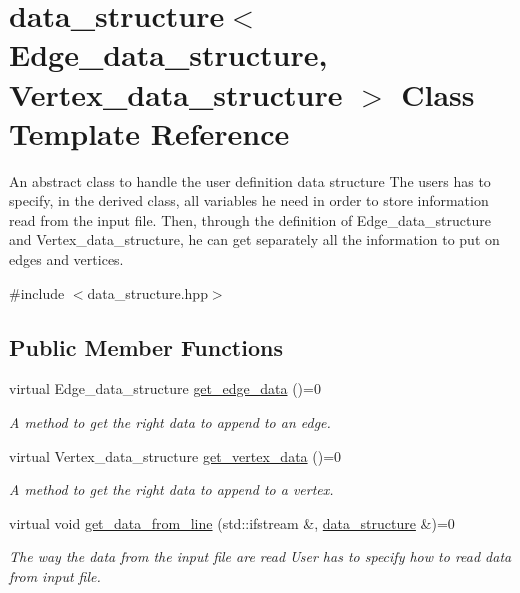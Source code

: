 \hypertarget{structdata__structure}{
\section{data\_\-structure$<$ Edge\_\-data\_\-structure, Vertex\_\-data\_\-structure $>$ Class Template Reference}
\label{structdata__structure}
}


An abstract class to handle the user definition data structure  The users has to specify, in the derived class, all variables he need in order to store information read from the input file. Then, through the definition of Edge\_\-data\_\-structure and Vertex\_\-data\_\-structure, he can get separately all the information to put on edges and vertices.  


{\ttfamily \#include $<$data\_\-structure.hpp$>$}\subsection*{Public Member Functions}
\begin{DoxyCompactItemize}
\item 
\hypertarget{structdata__structure_a08a8f29045d2c69e957a4e3120d7af10}{
virtual Edge\_\-data\_\-structure \hyperlink{structdata__structure_a08a8f29045d2c69e957a4e3120d7af10}{get\_\-edge\_\-data} ()=0}
\label{structdata__structure_a08a8f29045d2c69e957a4e3120d7af10}

\begin{DoxyCompactList}\small\item\em A method to get the right data to append to an edge. \item\end{DoxyCompactList}\item 
\hypertarget{structdata__structure_a01fbb29b47afaae30a6d2652ae82f90e}{
virtual Vertex\_\-data\_\-structure \hyperlink{structdata__structure_a01fbb29b47afaae30a6d2652ae82f90e}{get\_\-vertex\_\-data} ()=0}
\label{structdata__structure_a01fbb29b47afaae30a6d2652ae82f90e}

\begin{DoxyCompactList}\small\item\em A method to get the right data to append to a vertex. \item\end{DoxyCompactList}\item 
\hypertarget{structdata__structure_a9746c1f03a1a9c73571c59653a14650d}{
virtual void \hyperlink{structdata__structure_a9746c1f03a1a9c73571c59653a14650d}{get\_\-data\_\-from\_\-line} (std::ifstream \&, \hyperlink{structdata__structure}{data\_\-structure} \&)=0}
\label{structdata__structure_a9746c1f03a1a9c73571c59653a14650d}

\begin{DoxyCompactList}\small\item\em The way the data from the input file are read  User has to specify how to read data from input file. \item\end{DoxyCompactList}\end{DoxyCompactItemize}



